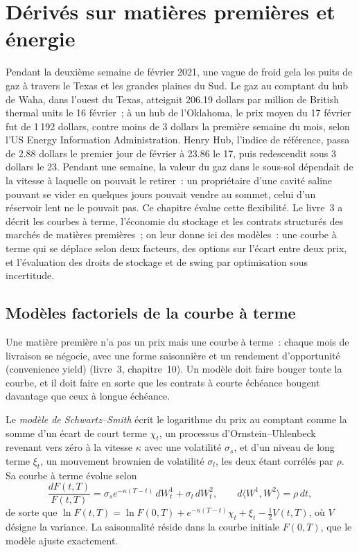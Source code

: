\chapter{Dérivés sur matières premières et énergie}\label{ch:rc:commodity-and-energy-derivatives}

Pendant la deuxième semaine de février 2021, une vague de froid gela les puits de gaz à travers le Texas et
les grandes plaines du Sud. Le gaz au comptant du hub de Waha, dans l'ouest du Texas, atteignit 206.19 dollars par
million de British thermal units le 16 février~; à un hub de l'Oklahoma, le prix moyen du 17 février fut
de 1\,192 dollars, contre moins de 3 dollars la première semaine du mois,
selon l'US Energy Information Administration. Henry Hub, l'indice de référence, passa
de 2.88 dollars le premier jour de février à 23.86 le 17, puis redescendit sous 3 dollars le 23. Pendant
une semaine, la valeur du gaz dans le sous-sol dépendait de la vitesse à laquelle on pouvait le retirer~: un
propriétaire d'une cavité saline pouvant se vider en quelques jours pouvait vendre au sommet, celui
d'un réservoir lent ne le pouvait pas. Ce chapitre évalue cette flexibilité. Le livre~3 a décrit
les courbes à terme, l'économie du stockage et les contrats structurés des marchés de matières premières~;
on leur donne ici des modèles~: une courbe à terme qui se déplace selon deux facteurs, des options sur l'écart
entre deux prix, et l'évaluation des droits de stockage et de swing par optimisation sous
incertitude.

\section{Modèles factoriels de la courbe à terme}

Une matière première n'a pas un prix mais une courbe à terme~: chaque mois de livraison se négocie, avec
une forme saisonnière et un rendement d'opportunité (convenience yield) (livre~3, chapitre~10). Un modèle doit faire bouger
toute la courbe, et il doit faire en sorte que les contrats à courte échéance bougent davantage que ceux à longue échéance.

\begin{definition}\label{def:rc:commodity-and-energy-derivatives:ss}
Le \emph{modèle de Schwartz--Smith} écrit le logarithme du prix au comptant
comme la somme d'un écart de court terme $\chi_t$, un processus d'Ornstein--Uhlenbeck revenant vers
zéro à la vitesse $\kappa$ avec une volatilité $\sigma_s$, et d'un niveau de long terme $\xi_t$, un mouvement brownien
de volatilité $\sigma_l$, les deux étant corrélés par $\rho$. Sa courbe à terme évolue selon
\[
\frac{dF(t,T)}{F(t,T)} = \sigma_se^{-\kappa(T-t)}\,dW^1_t+\sigma_l\,dW^2_t,\qquad d\langle W^1,W^2\rangle = \rho\,dt,
\]
de sorte que $\ln F(t,T) = \ln F(0,T)+e^{-\kappa(T-t)}\chi_t+\xi_t-\tfrac12V(t,T)$, où $V$ désigne la variance.
La saisonnalité réside dans la courbe initiale $F(0,T)$, que le modèle ajuste exactement.
\end{definition}

